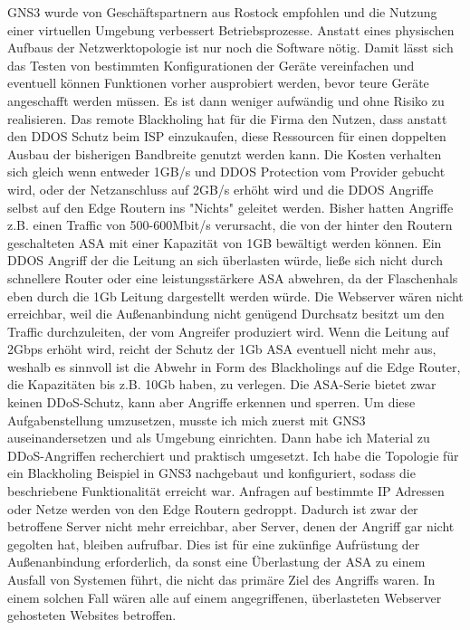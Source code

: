 \documentclass[english,runningheads,a4paper]{llncs}[2018/03/10]
\begin{document}
GNS3 wurde von Geschäftspartnern aus Rostock empfohlen und die Nutzung einer virtuellen Umgebung verbessert Betriebsprozesse. Anstatt eines physischen Aufbaus der Netzwerktopologie ist nur noch die Software nötig. Damit lässt sich das Testen von bestimmten Konfigurationen der Geräte vereinfachen und eventuell können Funktionen vorher ausprobiert werden, bevor teure Geräte angeschafft werden müssen. Es ist dann weniger aufwändig und ohne Risiko zu realisieren.
Das remote Blackholing hat für die Firma den Nutzen, dass anstatt den DDOS Schutz beim ISP einzukaufen, diese Ressourcen für einen doppelten Ausbau der bisherigen Bandbreite genutzt werden kann. Die Kosten verhalten sich gleich wenn entweder  1GB/s und DDOS Protection vom Provider gebucht wird, oder der Netzanschluss auf 2GB/s erhöht wird und die DDOS Angriffe selbst auf den Edge Routern ins "Nichts" geleitet werden. Bisher hatten Angriffe z.B. einen Traffic von 500-600Mbit/s verursacht, die von der hinter den Routern geschalteten ASA mit einer Kapazität von 1GB bewältigt werden können. Ein DDOS Angriff der die Leitung an sich überlasten würde, ließe sich nicht durch schnellere Router oder eine leistungsstärkere ASA abwehren, da der Flaschenhals eben durch die 1Gb Leitung dargestellt werden würde. Die Webserver wären nicht erreichbar, weil die Außenanbindung  nicht genügend Durchsatz besitzt um den Traffic durchzuleiten, der vom Angreifer produziert wird. Wenn die Leitung auf 2Gbps erhöht wird, reicht der Schutz der 1Gb ASA eventuell nicht mehr aus, weshalb es sinnvoll ist die Abwehr in Form des Blackholings auf die Edge Router, die Kapazitäten bis z.B. 10Gb haben, zu verlegen. Die ASA-Serie bietet zwar keinen DDoS-Schutz, kann aber Angriffe erkennen und sperren.
Um diese Aufgabenstellung umzusetzen, musste ich mich zuerst mit GNS3 auseinandersetzen und als Umgebung einrichten. Dann habe ich Material zu DDoS-Angriffen recherchiert und praktisch umgesetzt.  Ich habe die Topologie für ein Blackholing Beispiel in GNS3 nachgebaut und konfiguriert, sodass die beschriebene Funktionalität erreicht war. Anfragen auf bestimmte IP Adressen oder Netze werden von den Edge Routern gedroppt. Dadurch ist zwar der betroffene Server nicht mehr erreichbar, aber Server, denen der Angriff gar nicht gegolten hat, bleiben aufrufbar. Dies ist für eine zukünfige Aufrüstung der Außenanbindung erforderlich, da sonst eine Überlastung der ASA zu einem Ausfall von Systemen führt, die nicht das primäre Ziel des Angriffs waren. In einem solchen Fall wären alle auf einem angegriffenen, überlasteten Webserver gehosteten Websites betroffen.
\end{document}
